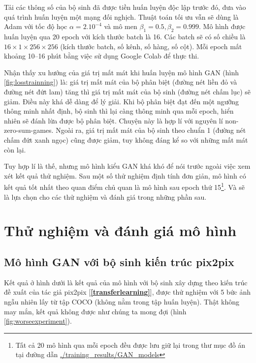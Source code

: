 \documentclass[a4paper, 12pt]{report}
\begin{document}
Tải các thông số của bộ sinh đã được tiền huấn luyện độc lập trước đó, đưa vào quá trình huấn luyện một mạng đối nghịch.
Thuật toán tối ưu vẫn sẽ dùng là Adam với tốc độ học $\alpha=2.10^{-4}$ và mô men $\beta_1 = 0.5, \beta_2=0.999$.
Mô hình được huấn luyện qua 20 epoch với kích thước batch là 16.
Các batch sẽ có số chiều là $16 \times 1 \times 256 \times 256$ (kích thước batch, số kênh, số hàng, số cột).
Mỗi epoch mất khoảng 10--16 phút bằng việc sử dụng Google Colab để thực thi.\vspace{5pt}

Nhận thấy xu hướng của giá trị mất mát khi huấn luyện mô hình GAN (hình \ref{fig:losstrainning}) là: giá trị mất mát của bộ phân biệt (đường nét liền đỏ và đường nét đứt lam) tăng thì giá trị mất mát của bộ sinh (đường nét chấm lục) sẽ giảm.
Điều này khá dễ dàng để lý giải.
Khi bộ phân biệt đạt đến một ngưỡng thông minh nhất định, bộ sinh thì lại càng thông minh qua mỗi epoch, hiển nhiên sẽ đánh lừa được bộ phân biệt.
Chuyện này là hợp lí với nguyên lí non-zero-sum-games.
Ngoài ra, giá trị mất mát của bộ sinh theo chuẩn 1 (đường nét chấm đứt xanh ngọc) cũng được giảm, tuy không đáng kể so với những mất mát còn lại.\vspace{5pt}

Tuy hợp lí là thế, nhưng mô hình kiểu GAN khá khó để nói trước ngoài việc xem xét kết quả thử nghiệm.
Sau một số thử nghiệm định tính đơn giản, mô hình có kết quả tốt nhất theo quan điểm chủ quan là mô hình sau epoch thứ 15\footnote{Tất cả 20 mô hình qua mỗi epoch đều được lưu giữ lại trong thư mục đồ án tại đường dẫn \href{https://github.com/dee-ex/EE3151\_SEM202\_PROJECT/tree/main/training_results/GAN_models}{./training\_results/GAN\_models}}.
Và sẽ là lựa chọn cho các thử nghiệm và đánh giá trong những phần sau.

\chapter{Thử nghiệm và đánh giá mô hình}\label{testmodel}

\section{Mô hình GAN với bộ sinh kiến trúc pix2pix}\label{badexperiment}

Kết quả ở hình dưới là kết quả của mô hình với bộ sinh xây dựng theo kiến trúc đề xuất của tác giả pix2pix [\textbf{\ref{transferlearning}}], được thử nghiệm với 5 bức ảnh ngẫu nhiên lấy từ tập COCO (không nằm trong tập huấn luyện).
Thật không may mắn, kết quả không được như chúng ta mong đợi (hình \ref{fig:worseexperiment}).
\end{document}
